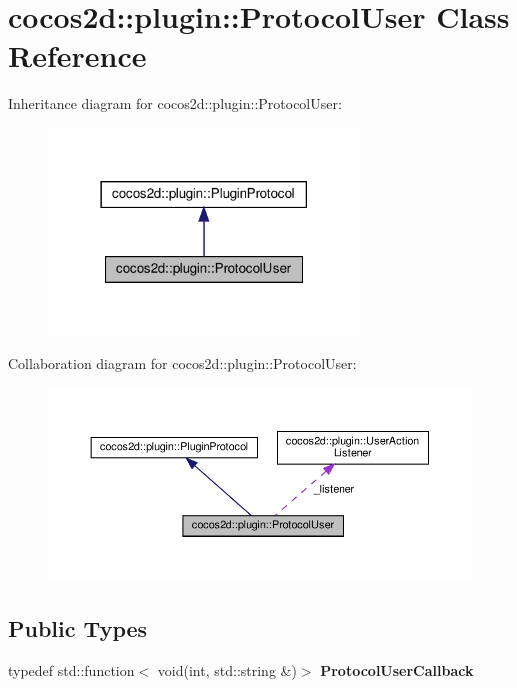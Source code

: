 \hypertarget{classcocos2d_1_1plugin_1_1ProtocolUser}{}\section{cocos2d\+:\+:plugin\+:\+:Protocol\+User Class Reference}
\label{classcocos2d_1_1plugin_1_1ProtocolUser}


Inheritance diagram for cocos2d\+:\+:plugin\+:\+:Protocol\+User\+:
\nopagebreak
\begin{figure}[H]
\begin{center}
\leavevmode
\includegraphics[width=234pt]{classcocos2d_1_1plugin_1_1ProtocolUser__inherit__graph}
\end{center}
\end{figure}


Collaboration diagram for cocos2d\+:\+:plugin\+:\+:Protocol\+User\+:
\nopagebreak
\begin{figure}[H]
\begin{center}
\leavevmode
\includegraphics[width=350pt]{classcocos2d_1_1plugin_1_1ProtocolUser__coll__graph}
\end{center}
\end{figure}
\subsection*{Public Types}
\begin{DoxyCompactItemize}
\item 
\mbox{\label{classcocos2d_1_1plugin_1_1ProtocolUser_a8daa51d4df7924e3aa9eaec51276d0f8}} 
typedef std\+::function$<$ void(int, std\+::string \&)$>$ {\bfseries Protocol\+User\+Callback}
\end{DoxyCompactItemize}
